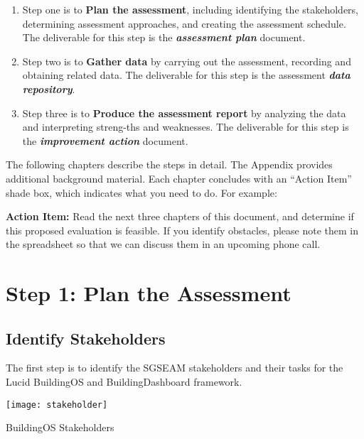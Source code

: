 \begin{enumerate}
\item Step one is to {\bf Plan the assessment}, including
 identifying the stakeholders, determining assessment approaches, and creating the assessment schedule. 
 The deliverable for this step is the \textbf{\textit{assessment
     plan}} document. 

\item Step two is to {\bf Gather data} by carrying out 
 the assessment, recording and obtaining related data. The deliverable for this step is the 
 assessment \textbf{\textit{data repository}}. 

\item Step three is to {\bf Produce the assessment report} by analyzing 
 the data and interpreting streng-ths and weaknesses. The deliverable
 for this step is the \textbf{\textit{improvement action}} document.

\end{enumerate}

The following chapters describe the steps in detail. The Appendix
provides additional background material. Each chapter concludes with
an ``Action Item'' shade box, which indicates what you need to do. For
example:


\begin{shadebox}
{\bf Action Item:} Read the next three chapters of this document, and determine if this proposed
evaluation is feasible. If you identify obstacles, please note them
in the spreadsheet so that we can discuss them in an upcoming phone call.
\end{shadebox}


\section{Step 1: Plan the Assessment}

\subsection{Identify Stakeholders}

The first step is to identify the SGSEAM stakeholders and their tasks
for the Lucid BuildingOS and BuildingDashboard
framework. 

\begin{table}[ht!]
  \center
  \texttt{[image: stakeholder]}
  \caption{BuildingOS Stakeholders}
  \label{table:lucid-stakeholders}
\end{table}

